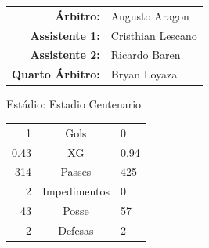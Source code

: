 \documentclass[11pt]{article}
\begin{document}
\vspace{0.5cm}
\begin{minipage}{0.65\textwidth}
\begin{center}
\begin{tabular}{rl}
\textbf{Árbitro:} & Augusto Aragon \\
\textbf{Assistente 1:} & Cristhian Lescano \\
\textbf{Assistente 2:} & Ricardo Baren \\
\textbf{Quarto Árbitro:} & Bryan Loyaza \\
\end{tabular}
\end{center}
\end{minipage}
\begin{minipage}{0.3\textwidth}
Estádio: Estadio Centenario\\
\begin{tabular}{rcl}
1 & Gols & 0 \\
0.43 & XG & 0.94 \\
314 & Passes & 425 \\
2 & Impedimentos & 0 \\
43 & Posse & 57 \\
2 & Defesas & 2 \\
\end{tabular}
\end{minipage}
\newpage
\end{document}
